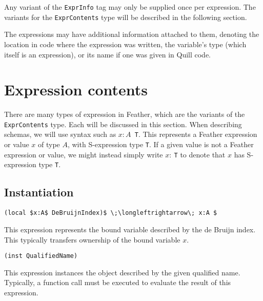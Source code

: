 \documentclass[11pt]{book}
\begin{document}
Any variant of the \lstinline{ExprInfo} tag may only be supplied once per expression.
The variants for the \lstinline{ExprContents} type will be described in the following section.

The expressions may have additional information attached to them, denoting the location in code where the expression was written, the variable's type (which itself is an expression), or its name if one was given in Quill code.

\section{Expression contents}

There are many types of expression in Feather, which are the variants of the \lstinline{ExprContents} type.
Each will be discussed in this section.
When describing schemas, we will use syntax such as \( x:A \)\lstinline! T!.
This represents a Feather expression or value \( x \) of type \( A \), with S-expression type \lstinline{T}.
If a given value is not a Feather expression or value, we might instead simply write \( x:\ \)\lstinline{T} to denote that \( x \) has S-expression type \lstinline{T}.


\subsection{Instantiation}
\begin{lstlisting}[mathescape=true]
(local $x:A$ DeBruijnIndex)$ \;\longleftrightarrow\; x:A $
\end{lstlisting}
This expression represents the bound variable described by the de Bruijn index.
This typically transfers ownership of the bound variable \( x \).
\begin{lstlisting}[mathescape=true]
(inst QualifiedName)
\end{lstlisting}
This expression instances the object described by the given qualified name.
Typically, a function call must be executed to evaluate the result of this expression.
\end{document}
